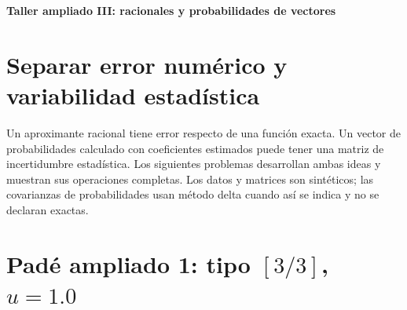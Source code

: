 \documentclass[11pt,a4paper]{article}
\theoremstyle{definition}
\newcommand{\parte}[1]{\par\bigskip\Needspace{8\baselineskip}\begin{center}{\Large\bfseries\color{azul}#1}\end{center}}
\newcounter{problema}
\begin{document}
\parte{Taller ampliado III: racionales y probabilidades de vectores}
\section{Separar error numérico y variabilidad estadística}
Un aproximante racional tiene error respecto de una función exacta. Un vector de probabilidades calculado con coeficientes estimados puede tener una matriz de incertidumbre estadística. Los siguientes problemas desarrollan ambas ideas y muestran sus operaciones completas. Los datos y matrices son sintéticos; las covarianzas de probabilidades usan método delta cuando así se indica y no se declaran exactas.

\section{\texorpdfstring{Padé ampliado 1: tipo $[3/3]$, $u=1.0$}{Padé ampliado 1: tipo [3/3], u=1.0}}
\end{document}
